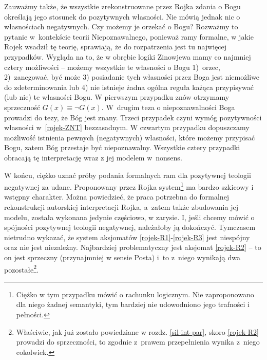 Zauważmy także, że wszystkie zrekonstruowane przez Rojka zdania o Bogu określają jego stosunek
do pozytywnych własności. Nie mówią jednak nic o własnościach negatywnych.
Czy możemy je orzekać o Bogu? Rozważmy to pytanie w~kontekście teorii Niepoznawalnego,
ponieważ ramy formalne, w jakie Rojek wsadził tę teorię, sprawiają, że do rozpatrzenia jest
tu najwięcej przypadków. Wygląda na to, że w obrębie logiki Zinowjewa mamy co najmniej
cztery możliwości – możemy wszystkie te własności o Bogu 1)~orzec, 2)~zanegować,
być może 3) posiadanie tych własności przez Boga jest niemożliwe do zdeterminowania lub
4) nie istnieje żadna ogólna reguła każąca przypisywać (lub nie) te własności Bogu.
W pierwszym przypadku znów otrzymamy sprzeczność $G(x) \equiv \neg G(x)$. W~drugim teza o niepoznawalności
Boga prowadzi do tezy, że Bóg jest znany. Trzeci przypadek czyni wymóg pozytywności własności
w~\ref{rojek-ZNT} bezzasadnym. W czwartym przypadku dopuszczamy możliwość istnienia pewnych (negatywnych) własności, które możemy przypisać Bogu, zatem Bóg przestaje być niepoznawalny. Wszystkie cztery przypadki obracają tę interpretację
wraz z jej modelem w~nonsens.



W końcu, ciężko uznać próby podania formalnych ram
dla pozytywnej teologii negatywnej za udane. Proponowany przez Rojka system\footnote{Ciężko w
tym przypadku mówić o rachunku logicznym. Nie zaproponowano dla niego
żadnej semantyki, tym bardziej nie udowodniono jego trafności i
pełności.} 
ma bardzo szkicowy i wstępny charakter.
Można powiedzieć, że praca potrzebna do formalnej rekonstrukcji autorskiej interpretacji Rojka,
a~zatem także zbudowania jej modelu, została wykonana
jedynie częściowo, w zarysie. I, jeśli chcemy mówić o spójności
pozytywnej teologii negatywnej, należałoby ją dokończyć.
Tymczasem nietrudno wykazać, że system aksjomatów
\eqref{rojek-R1}-\eqref{rojek-R3} jest niespójny oraz nie jest niezależny.
Najbardziej problematyczny jest aksjomat \eqref{rojek-R2} -- to on jest sprzeczny (przynajmniej w sensie Posta)
i~to z~niego wynikają dwa pozostałe\footnote{Właściwie, jak już zostało powiedziane w rozdz. \ref{sil-int-par}, skoro \eqref{rojek-R2} prowadzi do sprzeczności, to zgodnie z~prawem przepełnienia wynika z~niego cokolwiek.}.



